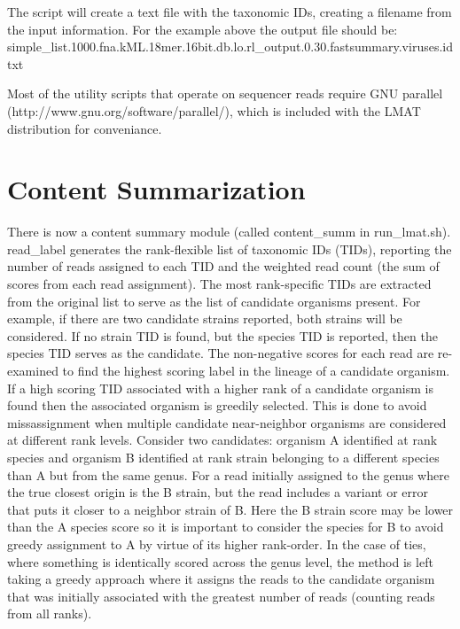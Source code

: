 \documentclass[11pt]{article}
\begin{document}
The script will create a text file with the taxonomic IDs, creating a filename from the input information. For the example above the output file should be:
simple_list.1000.fna.kML.18mer.16bit.db.lo.rl_output.0.30.fastsummary.viruses.idtxt




Most of the utility scripts that operate on sequencer reads require
GNU parallel (http://www.gnu.org/software/parallel/), which is included with the LMAT distribution for conveniance.

\section{Content Summarization}
There is now a content summary module (called {content_summ} in
 {run_lmat.sh}).  {read_label} generates the rank-flexible list of
 taxonomic IDs (TIDs), reporting the number of reads assigned to each
 TID and the weighted read count (the sum of scores from each read
 assignment). The most rank-specific TIDs are extracted from the
 original list to serve as the list of candidate organisms
 present. For example, if there are two candidate strains reported,
 both strains will be considered. If no strain TID is found, but the
 species TID is reported, then the species TID serves as the
 candidate. The non-negative scores for each read are re-examined to
 find the highest scoring label in the lineage of a candidate
 organism. If a high scoring TID associated with a higher rank of a
 candidate organism is found then the associated organism is greedily
 selected. This is done to avoid missassignment when multiple
 candidate near-neighbor organisms are considered at different rank
 levels. Consider two candidates: organism A identified at rank
 species and organism B identified at rank strain belonging to a
 different species than A but from the same genus. For a read
 initially assigned to the genus where the true closest origin is the
 B strain, but the read includes a variant or error that puts it
 closer to a neighbor strain of B. Here the B strain score may be
 lower than the A species score so it is important to consider the
 species for B to avoid greedy assignment to A by virtue of its higher
 rank-order. In the case of ties, where something is identically
 scored across the genus level, the method is left taking a greedy
 approach where it assigns the reads to the candidate organism that
 was initially associated with the greatest number of reads (counting
 reads from all ranks).
\end{document}
